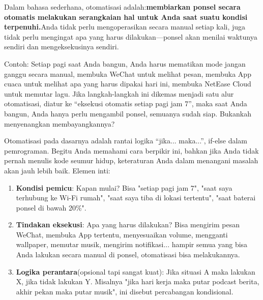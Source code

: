 


Dalam bahasa sederhana, otomatisasi adalah:\textbf{membiarkan ponsel secara otomatis melakukan serangkaian hal untuk Anda saat suatu kondisi terpenuhi.}Anda tidak perlu mengoperasikan secara manual setiap kali, juga tidak perlu mengingat apa yang harus dilakukan—ponsel akan menilai waktunya sendiri dan mengeksekusinya sendiri.

Contoh: Setiap pagi saat Anda bangun, Anda harus mematikan mode jangan ganggu secara manual, membuka WeChat untuk melihat pesan, membuka App cuaca untuk melihat apa yang harus dipakai hari ini, membuka NetEase Cloud untuk memutar lagu. Jika langkah-langkah ini dikemas menjadi satu alur otomatisasi, diatur ke “eksekusi otomatis setiap pagi jam 7”, maka saat Anda bangun, Anda hanya perlu mengambil ponsel, semuanya sudah siap. Bukankah menyenangkan membayangkannya?

Otomatisasi pada dasarnya adalah rantai logika “jika... maka...”, if-else dalam pemrograman. Begitu Anda memahami cara berpikir ini, bahkan jika Anda tidak pernah menulis kode seumur hidup, keteraturan Anda dalam menangani masalah akan jauh lebih baik. Elemen inti:

\begin{enumerate}
  \item \textbf{Kondisi pemicu}: Kapan mulai? Bisa "setiap pagi jam 7", "saat saya terhubung ke Wi-Fi rumah", "saat saya tiba di lokasi tertentu", "saat baterai ponsel di bawah 20\%".
  \item \textbf{Tindakan eksekusi}: Apa yang harus dilakukan? Bisa mengirim pesan WeChat, membuka App tertentu, menyesuaikan volume, mengganti wallpaper, memutar musik, mengirim notifikasi... hampir semua yang bisa Anda lakukan secara manual di ponsel, otomatisasi bisa melakukannya.
  \item \textbf{Logika perantara}(opsional tapi sangat kuat): Jika situasi A maka lakukan X, jika tidak lakukan Y. Misalnya "jika hari kerja maka putar podcast berita, akhir pekan maka putar musik", ini disebut percabangan kondisional.
\end{enumerate}

